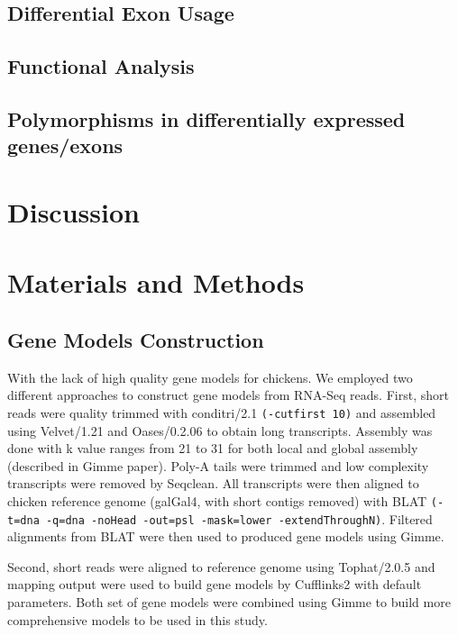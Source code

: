 \documentclass[10pt]{article}
\begin{document}
\subsection*{Differential Exon Usage}

\subsection*{Functional Analysis}
\subsection*{Polymorphisms in differentially expressed genes/exons}


\section*{Discussion}

\section*{Materials and Methods}
\subsection{Gene Models Construction}
With the lack of high quality gene models for chickens. We employed two different approaches to
construct gene models from RNA-Seq reads.
First, short reads were quality trimmed with conditri/2.1\cite{} \texttt{(-cutfirst 10)}
and assembled using Velvet/1.21\cite{} and Oases/0.2.06\cite{} to obtain long transcripts.
Assembly was done with k value ranges from 21 to 31 for both local and global assembly
(described in Gimme paper\cite{}).
Poly-A tails were trimmed and low complexity transcripts were removed by Seqclean\cite{}.
All transcripts were then aligned to chicken reference genome (galGal4, with short
contigs removed) with BLAT\cite{} \texttt{(-t=dna -q=dna -noHead -out=psl -mask=lower -extendThroughN)}.
Filtered alignments from BLAT were then used to produced gene models using Gimme.

Second, short reads were aligned to reference genome using Tophat/2.0.5\cite{} and mapping output were used to
build gene models by Cufflinks2\cite{} with default parameters.
Both set of gene models were combined using Gimme to build more comprehensive models
to be used in this study.
\end{document}
